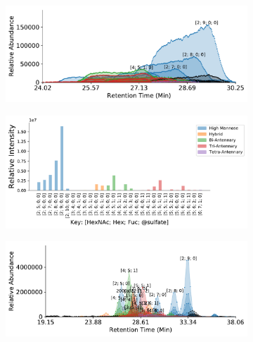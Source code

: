     \begin{figure}[tb]
        \centering
        \begin{minipage}{1\linewidth}
            \centering
            \begin{subfigure}[b]{0.49\linewidth}
                \includegraphics[width=1\linewidth, valign=t]{figure/native_phil82_chromatograms.pdf}
                \subcaption{
                    \label{fig:phil82_assignment:a}
                }
            \end{subfigure}
            \vspace{0pt}
            \begin{subfigure}[b]{0.49\linewidth}
                \includegraphics[width=1\linewidth, valign=b]{figure/native_phil82_abundances.pdf}
                \subcaption{
                    \label{fig:phil82_assignment:b}
                }
            \end{subfigure}
        \end{minipage}
        \begin{minipage}{1\linewidth}
            \centering
            \begin{subfigure}[b]{0.49\linewidth}
                \includegraphics[width=1\linewidth, valign=t]{figure/dp_phil82_chromatograms.pdf}

\end{subfigure}
\end{minipage}
\end{figure}
